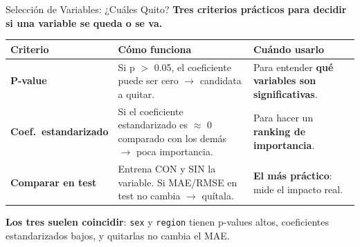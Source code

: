 \documentclass[aspectratio=169, 11pt]{beamer}
\begin{document}
\begin{frame}[shrink=5]{Selección de Variables: ¿Cuáles Quito?}
  \vspace{-4pt}
  {\footnotesize\color{arcaDark}\bfseries
    Tres criterios prácticos para decidir si una variable se queda o se va.}

  \vspace{6pt}
  {\scriptsize
  \begin{tabular}{@{}lp{5cm}p{4.5cm}@{}}
    \toprule
    \textbf{Criterio} & \textbf{Cómo funciona} & \textbf{Cuándo usarlo} \\
    \midrule
    \textbf{P-value} &
      Si p $>$ 0.05, el coeficiente puede ser cero $\to$ candidata a quitar. &
      Para entender \textbf{qué variables son significativas}. \\[4pt]
    \textbf{Coef.\ estandarizado} &
      Si el coeficiente estandarizado es $\approx$ 0 comparado con los demás $\to$
      poca importancia. &
      Para hacer un \textbf{ranking de importancia}. \\[4pt]
    \textbf{Comparar en test} &
      Entrena CON y SIN la variable. Si MAE/RMSE en test no cambia $\to$
      quítala. &
      \textbf{El más práctico}: mide el impacto real. \\
    \bottomrule
  \end{tabular}
  }

  \vspace{6pt}
  {\footnotesize\color{arcaDark}
    \faLightbulb\hspace{4pt}
    \textbf{Los tres suelen coincidir}: \texttt{sex} y \texttt{region} tienen
    p-values altos, coeficientes estandarizados bajos, y quitarlas no cambia
    el MAE.}
\end{frame}
\end{document}

